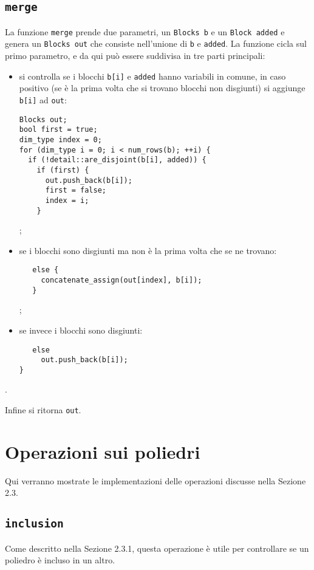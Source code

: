 \documentclass{mimosis}
\theoremstyle{definition}
\begin{document}
\subsection{\texttt{merge}}
\label{sec:orge491a29}
La funzione \texttt{merge} prende due parametri, un \texttt{Blocks b} e un \texttt{Block added} e
genera un \texttt{Blocks out} che consiste nell'unione di \texttt{b} e \texttt{added}. La funzione
cicla sul primo parametro, e da qui può essere suddivisa in tre parti principali:

\begin{itemize}
\item si controlla se i blocchi \texttt{b[i]} e \texttt{added} hanno variabili in comune, in caso
positivo (se è la prima volta che si trovano blocchi non disgiunti) si
aggiunge \texttt{b[i]} ad \texttt{out}:
\lstset{style=mystyle,language=C++,label= ,caption= ,captionpos=b,numbers=none}
\begin{lstlisting}
Blocks out;
bool first = true;
dim_type index = 0;
for (dim_type i = 0; i < num_rows(b); ++i) {
  if (!detail::are_disjoint(b[i], added)) {
    if (first) {
      out.push_back(b[i]);
      first = false;
      index = i;
    }
\end{lstlisting}
;
\item se i blocchi sono disgiunti ma non è la prima volta che se ne trovano:
\lstset{style=mystyle,language=C++,label= ,caption= ,captionpos=b,numbers=none}
\begin{lstlisting}
   else {
     concatenate_assign(out[index], b[i]);
   }
\end{lstlisting}
;
\item se invece i blocchi sono disgiunti:
\lstset{style=mystyle,language=C++,label= ,caption= ,captionpos=b,numbers=none}
\begin{lstlisting}
   else
     out.push_back(b[i]);
}
\end{lstlisting}
\end{itemize}
.

Infine si ritorna \texttt{out}.
\section{Operazioni sui poliedri}
\label{sec:org46ffb4a}
Qui verranno mostrate le implementazioni delle operazioni discusse nella Sezione
2.3.

\subsection{\texttt{inclusion}}
\label{sec:org47032f4}
Come descritto nella Sezione 2.3.1, questa operazione è utile per controllare se
un poliedro è incluso in un altro.
\end{document}
